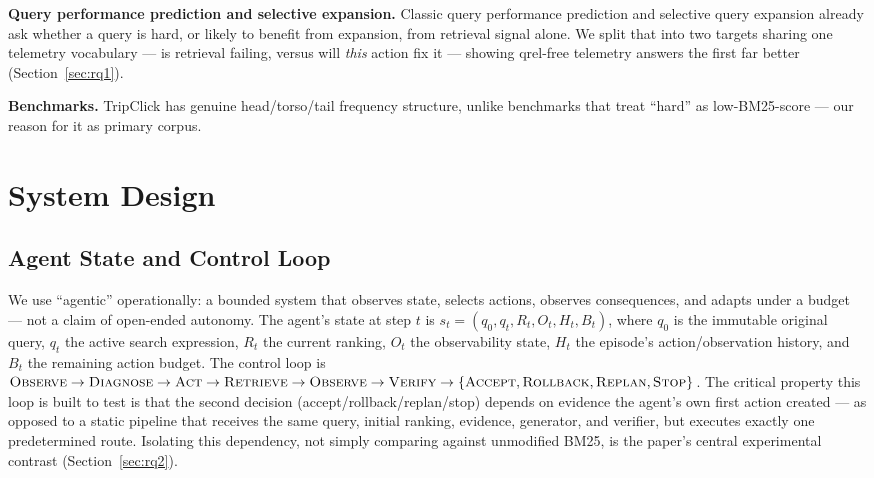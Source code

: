 \documentclass[conference]{IEEEtran}
\begin{document}
\textbf{Query performance prediction and selective expansion.} Classic
query performance prediction \cite{qpp-clarity} and selective query
expansion \cite{selective-qe} already ask whether a query is hard, or
likely to benefit from expansion, from retrieval signal alone. We
split that into two targets sharing one telemetry vocabulary --- is
retrieval failing, versus will \emph{this} action fix it --- showing
qrel-free telemetry answers the first far better (Section~\ref{sec:rq1}).

\textbf{Benchmarks.} TripClick \cite{tripclick} has genuine
head/torso/tail frequency structure, unlike benchmarks that treat
``hard'' as low-BM25-score --- our reason for it as primary corpus.

\section{System Design}

\subsection{Agent State and Control Loop}

We use ``agentic'' operationally: a bounded system that observes
state, selects actions, observes consequences, and adapts under a
budget --- not a claim of open-ended autonomy. The agent's state at
step $t$ is
$s_t = (q_0, q_t, R_t, O_t, H_t, B_t)$,
where $q_0$ is the immutable original query, $q_t$ the active search
expression, $R_t$ the current ranking, $O_t$ the observability state,
$H_t$ the episode's action/observation history, and $B_t$ the remaining
action budget. The control loop is $\textsc{Observe} \to
\textsc{Diagnose} \to \textsc{Act} \to \textsc{Retrieve} \to
\textsc{Observe} \to \textsc{Verify} \to \{\textsc{Accept},
\textsc{Rollback}, \textsc{Replan}, \textsc{Stop}\}$. The critical property this loop is built to test is that the second
decision (accept/rollback/replan/stop) depends on evidence the agent's
own first action created --- as opposed to a static pipeline that
receives the same query, initial ranking, evidence, generator, and
verifier, but executes exactly one predetermined route. Isolating this
dependency, not simply comparing against unmodified BM25, is the
paper's central experimental contrast (Section~\ref{sec:rq2}).
\end{document}

